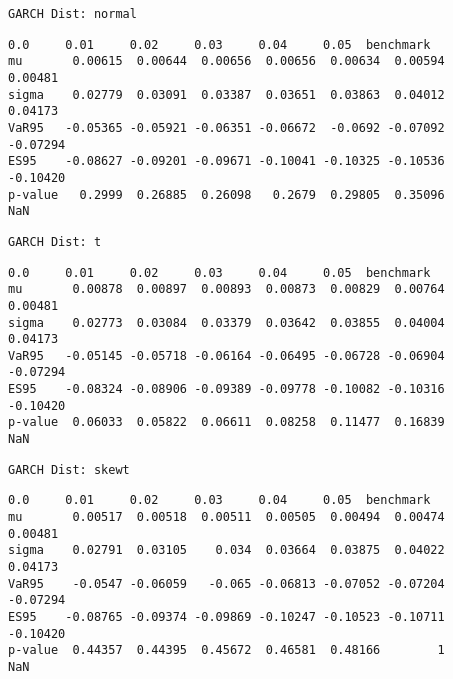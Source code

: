 \documentclass[11pt]{article}
\begin{document}
    \begin{Verbatim}[commandchars=\\\{\}]
GARCH Dist: normal
    \end{Verbatim}

    
    \begin{Verbatim}[commandchars=\\\{\}]
             0.0     0.01     0.02     0.03     0.04     0.05  benchmark
mu       0.00615  0.00644  0.00656  0.00656  0.00634  0.00594    0.00481
sigma    0.02779  0.03091  0.03387  0.03651  0.03863  0.04012    0.04173
VaR95   -0.05365 -0.05921 -0.06351 -0.06672  -0.0692 -0.07092   -0.07294
ES95    -0.08627 -0.09201 -0.09671 -0.10041 -0.10325 -0.10536   -0.10420
p-value   0.2999  0.26885  0.26098   0.2679  0.29805  0.35096        NaN
    \end{Verbatim}

    
    \begin{Verbatim}[commandchars=\\\{\}]
GARCH Dist: t
    \end{Verbatim}

    
    \begin{Verbatim}[commandchars=\\\{\}]
             0.0     0.01     0.02     0.03     0.04     0.05  benchmark
mu       0.00878  0.00897  0.00893  0.00873  0.00829  0.00764    0.00481
sigma    0.02773  0.03084  0.03379  0.03642  0.03855  0.04004    0.04173
VaR95   -0.05145 -0.05718 -0.06164 -0.06495 -0.06728 -0.06904   -0.07294
ES95    -0.08324 -0.08906 -0.09389 -0.09778 -0.10082 -0.10316   -0.10420
p-value  0.06033  0.05822  0.06611  0.08258  0.11477  0.16839        NaN
    \end{Verbatim}

    
    \begin{Verbatim}[commandchars=\\\{\}]
GARCH Dist: skewt
    \end{Verbatim}

    
    \begin{Verbatim}[commandchars=\\\{\}]
             0.0     0.01     0.02     0.03     0.04     0.05  benchmark
mu       0.00517  0.00518  0.00511  0.00505  0.00494  0.00474    0.00481
sigma    0.02791  0.03105    0.034  0.03664  0.03875  0.04022    0.04173
VaR95    -0.0547 -0.06059   -0.065 -0.06813 -0.07052 -0.07204   -0.07294
ES95    -0.08765 -0.09374 -0.09869 -0.10247 -0.10523 -0.10711   -0.10420
p-value  0.44357  0.44395  0.45672  0.46581  0.48166        1        NaN
    \end{Verbatim}
\end{document}
